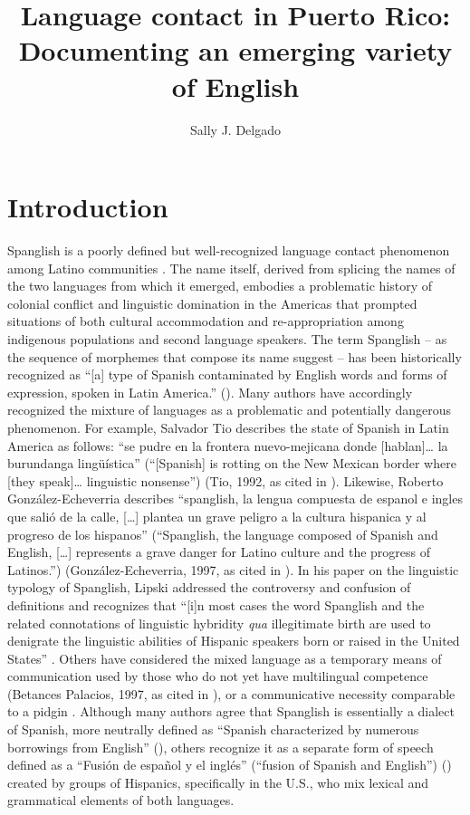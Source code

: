 \documentclass[output=paper,colorlinks,citecolor=brown]{langscibook}
\author{Sally J. Delgado\orcid{}\affiliation{University of Puerto Rico at Cayey}}
\title[Language contact in Puerto Rico]
      {Language contact in Puerto Rico: Documenting an emerging variety of English}
\begin{document}
\maketitle


\section{Introduction}

Spanglish is a poorly defined but well-recognized language contact phenomenon among Latino communities \citep{Ardila_2005,Otheguy_Stern_2010,MontesAlcala_2018}. The name itself, derived from splicing the names of the two languages from which it emerged, embodies a problematic history of colonial conflict and linguistic domination in the Americas that prompted situations of both cultural accommodation and re-appropriation among indigenous populations and second language speakers. The term Spanglish -- as the sequence of morphemes that compose its name suggest -- has been historically recognized as “[a] type of Spanish contaminated by English words and forms of expression, spoken in Latin America.” (\cite[v. XVI: 105]{OxfordEnglishDictionary_1989}). Many authors have accordingly recognized the mixture of languages as a problematic and potentially dangerous phenomenon. For example, Salvador Tio describes the state of Spanish in Latin America as follows: “se pudre en la frontera nuevo-mejicana donde [hablan]… la burundanga lingüística” (“[Spanish] is rotting on the New Mexican border where [they speak]… linguistic nonsense”) (Tio, 1992, as cited in \cite[1]{Lipski_2004}). Likewise, Roberto González-Echeverria describes “spanglish, la lengua compuesta de espanol e ingles que salió de la calle, […] plantea un grave peligro a la cultura hispanica y al progreso de los hispanos” (“Spanglish, the language composed of Spanish and English, […] represents a grave danger for Latino culture and the progress of Latinos.”) (González-Echeverria, 1997, as cited in \cite[1--2]{Lipski_2004}). In his paper on the linguistic typology of Spanglish, Lipski addressed the controversy and confusion of definitions and recognizes that “[i]n most cases the word Spanglish and the related connotations of linguistic hybridity \emph{qua} illegitimate birth are used to denigrate the linguistic abilities of Hispanic speakers born or raised in the United States” \citep[1]{Lipski_2004}. Others have considered the mixed language as a temporary means of communication used by those who do not yet have multilingual competence (Betances Palacios, 1997, as cited in \cite[1]{Lipski_2004}), or a communicative necessity comparable to a pidgin \citep[78]{Ardila_2005}. Although many authors agree that Spanglish is essentially a dialect of Spanish, more neutrally defined as “Spanish characterized by numerous borrowings from English” (\cite{AmericanHeritage_dict_EnglishLanguage_2020}), others recognize it as a separate form of speech defined as a “Fusión de español y el inglés” (“fusion of Spanish and English”) (\cite{RealAcademiaEspañola_2020}) created by groups of Hispanics, specifically in the U.S., who mix lexical and grammatical elements of both languages.
\end{document}
